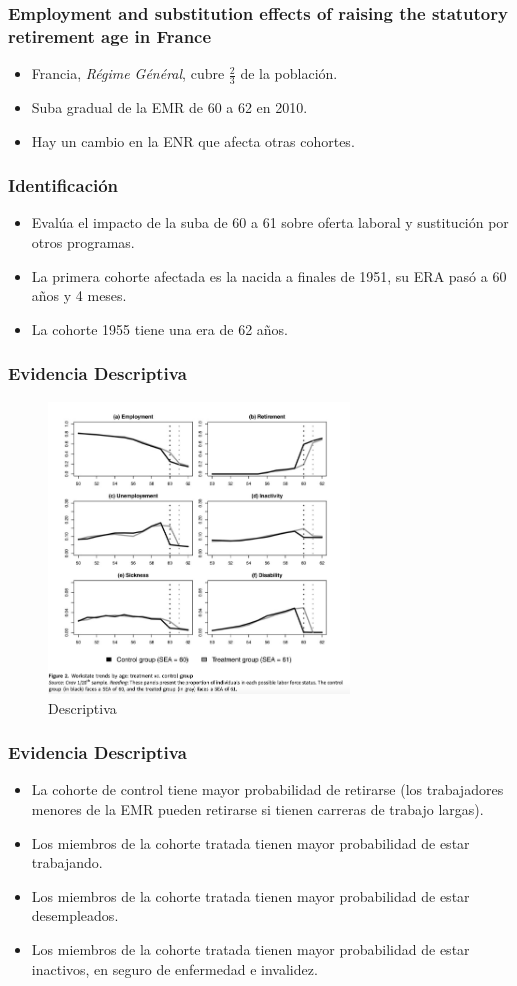 \documentclass{beamer}
\begin{document}
  \frame
  {
     \frametitle{Employment and substitution effects of raising the statutory retirement age in France}
     \begin{itemize}
       \item Francia, \textit{Régime Général}, cubre $\frac{2}{3}$ de la población.
       \item Suba gradual de la EMR de 60 a 62 en 2010.
       \item Hay un cambio en la ENR que afecta otras cohortes.
     \end{itemize}
  }
  \frame
  {
    \frametitle{Identificación}
      \begin{itemize}
        \item Evalúa el impacto de la suba de 60 a 61 sobre oferta laboral y sustitución por otros programas.
        \item La primera cohorte afectada es la nacida a finales de 1951, su ERA pasó a 60 años y 4 meses.
       \item La cohorte 1955 tiene una era de 62 años.
     \end{itemize}
  }
  \frame
  {
    \frametitle{Evidencia Descriptiva}
      \begin{figure}[htp]
        \centering
        \includegraphics[width=8cm]{imgs/rabate-fig2}
        \caption{Descriptiva}
        \label{fig:fig2}
      \end{figure}
  }
  \frame
  {
    \frametitle{Evidencia Descriptiva}
        \begin{itemize}
        \item La cohorte de control tiene mayor probabilidad de retirarse (los trabajadores menores de la EMR pueden retirarse si tienen carreras de trabajo largas).
        \item Los miembros de la cohorte tratada tienen mayor probabilidad de estar trabajando.
        \item Los miembros de la cohorte tratada tienen mayor probabilidad de estar desempleados.
        \item Los miembros de la cohorte tratada tienen mayor probabilidad de estar inactivos, en seguro de enfermedad e invalidez.
     \end{itemize}
    
  }
\end{document}
